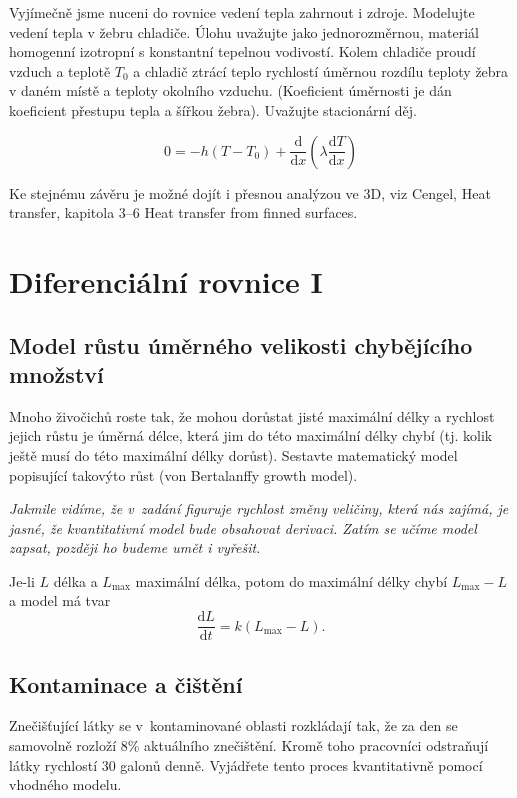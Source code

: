Vyjímečně jsme nuceni do rovnice vedení tepla zahrnout i zdroje. 
Modelujte vedení tepla v žebru chladiče. Úlohu uvažujte jako
jednorozměrnou, materiál homogenní izotropní s konstantní tepelnou
vodivostí. Kolem chladiče proudí vzduch a teplotě $T_0$ a chladič
ztrácí teplo rychlostí úměrnou rozdílu teploty žebra v daném místě a
teploty okolního vzduchu. (Koeficient úměrnosti je dán koeficient přestupu tepla a šířkou žebra). Uvažujte stacionární děj.

\reseni

$$0=-h(T-T_0)+\frac{\mathrm d}{\mathrm dx}\left(\lambda \frac{\mathrm dT}{\mathrm dx}\right)$$


Ke stejnému závěru je možné dojít i přesnou analýzou ve 3D, viz Cengel, Heat transfer, kapitola 3–6 Heat transfer from finned surfaces.

\konec

\section{Diferenciální rovnice I}

\subsection{Model růstu úměrného velikosti chybějícího množství}  \label{krava}
Mnoho
živočichů roste tak, že mohou dorůstat jisté maximální délky a
rychlost jejich růstu je úměrná délce, která jim do této maximální
délky chybí (tj. kolik ještě musí do této maximální délky
dorůst). Sestavte matematický model popisující takovýto růst
(von Bertalanffy growth model).

\textit{Jakmile vidíme, že v zadání figuruje rychlost změny veličiny,
  která nás zajímá, je jasné, že kvantitativní model bude obsahovat
  derivaci. Zatím se učíme model zapsat, později ho budeme umět i vyřešit.}

\def\derivace#1#2{\frac{\mathrm d#1}{\mathrm d#2}}

\reseni
Je-li $L$ délka a $L_{\max}$ maximální délka, potom do maximální délky chybí  $L_{\max}-L$ a model má tvar
$$\derivace Lt=k (L_{\max}-L).$$
\konec

\subsection{Kontaminace a čištění}
Znečišťující látky se v kontaminované oblasti rozkládají tak, že za den se samovolně rozloží 
$8\%$ aktuálního znečištění. Kromě toho pracovníci odstraňují látky rychlostí $30$
galonů denně. Vyjádřete tento proces kvantitativně pomocí vhodného
modelu.

